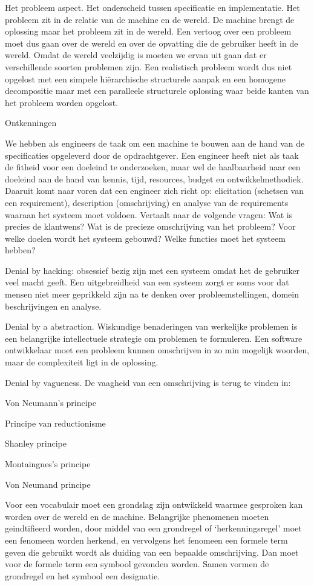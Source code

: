 Het probleem aspect. Het onderscheid tussen specificatie en implementatie. Het probleem zit in de relatie van de machine en de wereld. De machine brengt de oplossing maar het probleem zit in de wereld. Een vertoog over een probleem moet dus gaan over de wereld en over de opvatting die de gebruiker heeft in de wereld. Omdat de wereld veelzijdig is moeten we ervan uit gaan dat er verschillende soorten problemen zijn. Een realistisch probleem wordt dus niet opgelost met een simpele hiërarchische structurele aanpak en een homogene decompositie maar met een paralleele structurele oplossing waar beide kanten van het probleem worden opgelost. 



Ontkenningen 

We hebben als engineers de taak om een machine te bouwen aan de hand van de specificaties opgeleverd door de opdrachtgever. Een engineer heeft niet als taak de fitheid voor een doeleind te onderzoeken, maar wel de haalbaarheid naar een doeleind aan de hand van kennis, tijd, resources, budget en ontwikkelmethodiek. Daaruit komt naar voren dat een engineer zich richt op: elicitation (schetsen van een requirement), description (omschrijving) en analyse van de requirements waaraan het systeem moet voldoen. Vertaalt naar de volgende vragen: Wat is precies de klantwens?  Wat is de precieze omschrijving van het probleem? Voor welke doelen wordt het systeem gebouwd? Welke functies moet het systeem hebben? 

Denial by hacking: obsessief bezig zijn met een systeem omdat het de gebruiker veel macht geeft. Een uitgebreidheid van een systeem zorgt er soms voor dat mensen niet meer geprikkeld zijn na te denken over probleemstellingen, domein beschrijvingen en analyse. 

Denial by a abstraction. Wiskundige benaderingen van werkelijke problemen is  een belangrijke intellectuele strategie om problemen te formuleren. Een software ontwikkelaar moet een probleem kunnen omschrijven in zo min mogelijk woorden, maar de complexiteit ligt in de oplossing. 

Denial by vagueness. De vaagheid van een omschrijving is terug te vinden in: 

Von Neumann’s principe 

Principe van reductionisme 

Shanley principe 

Montaingnes’s principe 

Von Neumand principe 

Voor een vocabulair  moet een grondslag zijn ontwikkeld waarmee gesproken kan worden over de wereld en de machine. Belangrijke phenomenen moeten geindtifieerd worden, door middel van een grondregel  of ‘herkenningsregel’ moet een fenomeen worden herkend, en vervolgens het fenomeen een formele term geven die gebruikt wordt als duiding van een bepaalde omschrijving. Dan moet voor de formele term een symbool gevonden worden. Samen vormen de grondregel en het symbool een designatie. 

